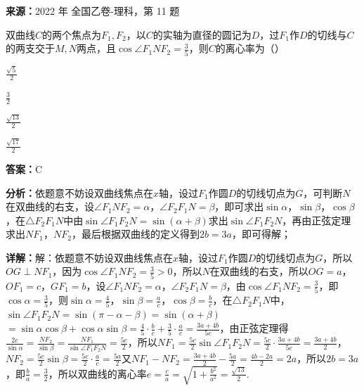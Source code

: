 \begin{question}[points=5]
\textbf{来源：}2022 年 全国乙卷-理科，第 11 题\par
双曲线$C$的两个焦点为$F_1, F_2$，以$C$的实轴为直径的圆记为$D$，过$F_1$作$D$的切线与$C$的两支交于$M, N$两点，且$\cos\angle F_1NF_2 = \frac{3}{5}$，则$C$的离心率为（\qquad）
\begin{choices}
  \item $\frac{\sqrt{5}}{2}$
  \item $\frac{3}{2}$
  \item $\frac{\sqrt{13}}{2}$
  \item $\frac{\sqrt{17}}{2}$
\end{choices}
\begin{solution}
\textbf{答案：}C

\textbf{分析：}依题意不妨设双曲线焦点在$x$轴，设过$F_1$作圆$D$的切线切点为$G$，可判断$N$在双曲线的右支，设$\angle F_1NF_2 = \alpha$，$\angle F_2F_1N = \beta$，即可求出$\sin\alpha$，$\sin\beta$，$\cos\beta$，在$\triangle F_2F_1N$中由$\sin\angle F_1F_2N = \sin(\alpha+\beta)$求出$\sin\angle F_1F_2N$，再由正弦定理求出$NF_1$，$NF_2$，最后根据双曲线的定义得到$2b=3a$，即可得解；

\textbf{详解：}解：依题意不妨设双曲线焦点在$x$轴，设过$F_1$作圆$D$的切线切点为$G$，所以$OG \perp NF_1$，因为$\cos\angle F_1NF_2 = \frac{3}{5} > 0$，所以$N$在双曲线的右支，所以$OG = a$，$OF_1 = c$，$GF_1 = b$，设$\angle F_1NF_2 = \alpha$，$\angle F_2F_1N = \beta$，由$\cos\angle F_1NF_2 = \frac{3}{5}$，即$\cos\alpha = \frac{3}{5}$，则$\sin\alpha = \frac{4}{5}$，$\sin\beta = \frac{a}{c}$，$\cos\beta = \frac{b}{c}$，在$\triangle F_2F_1N$中，$\sin\angle F_1F_2N = \sin(\pi-\alpha-\beta) = \sin(\alpha+\beta)$\\$= \sin\alpha\cos\beta + \cos\alpha\sin\beta = \frac{4}{5}\cdot\frac{b}{c} + \frac{3}{5}\cdot\frac{a}{c} = \frac{3a+4b}{5c}$，由正弦定理得$\frac{2c}{\sin\alpha} = \frac{NF_2}{\sin\beta} = \frac{NF_1}{\sin\angle F_1F_2N} = \frac{5c}{2}$，所以$NF_1 = \frac{5c}{2}\sin\angle F_1F_2N = \frac{5c}{2}\cdot\frac{3a+4b}{5c} = \frac{3a+4b}{2}$，$NF_2 = \frac{5c}{2}\sin\beta = \frac{5c}{2}\cdot\frac{a}{c} = \frac{5a}{2}$又$NF_1 - NF_2 = \frac{3a+4b}{2} - \frac{5a}{2} = \frac{4b-2a}{2} = 2a$，所以$2b = 3a$，即$\frac{b}{a} = \frac{3}{2}$，所以双曲线的离心率$e = \frac{c}{a} = \sqrt{1+\frac{b^2}{a^2}} = \frac{\sqrt{13}}{2}$.
\end{solution}
\end{question}

